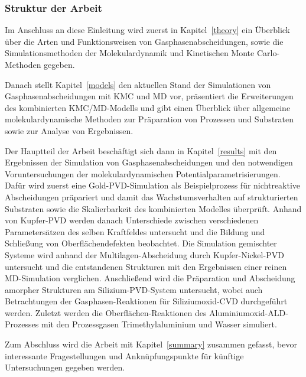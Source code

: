 \subsubsection{Struktur der Arbeit}

Im Anschluss an diese Einleitung wird zuerst in Kapitel~\ref{theory} ein Überblick über die Arten und Funktionsweisen von Gasphasenabscheidungen, sowie die Simulationsmethoden der Molekulardynamik und Kinetischen Monte Carlo-Methoden gegeben.

Danach stellt Kapitel~\ref{models} den aktuellen Stand der Simulationen von Gasphasenabscheidungen mit KMC und MD vor, präsentiert die Erweiterungen des kombinierten KMC/MD-Modells und gibt einen Überblick über allgemeine molekulardynamische Methoden zur Präparation von Prozessen und Substraten sowie zur Analyse von Ergebnissen.

Der Hauptteil der Arbeit beschäftigt sich dann in Kapitel~\ref{results} mit den Ergebnissen der Simulation von Gasphasenabscheidungen und den notwendigen Voruntersuchungen der molekulardynamischen Potentialparametrisierungen.
Dafür wird zuerst eine Gold-PVD-Simulation als Beispielprozess für nichtreaktive Abscheidungen präpariert und damit das Wachstumsverhalten auf strukturierten Substraten sowie die Skalierbarkeit des kombinierten Modelles überprüft.
Anhand von Kupfer-PVD werden danach Unterschiede zwischen verschiedenen Parametersätzen des selben Kraftfeldes untersucht und die Bildung und Schließung von Oberflächendefekten beobachtet.
Die Simulation gemischter Systeme wird anhand der Multilagen-Abscheidung durch Kupfer-Nickel-PVD untersucht und die entstandenen Strukturen mit den Ergebnissen einer reinen MD-Simulation verglichen.
Anschließend wird die Präparation und Abscheidung amorpher Strukturen am Silizium-PVD-System untersucht, wobei auch Betrachtungen der Gasphasen-Reaktionen für Siliziumoxid-CVD durchgeführt werden.
Zuletzt werden die Oberflächen-Reaktionen des Aluminiumoxid-ALD-Prozesses mit den Prozessgasen Trimethylaluminium und Wasser simuliert.

Zum Abschluss wird die Arbeit mit Kapitel~\ref{summary} zusammen gefasst, bevor interessante Fragestellungen und Anknüpfungspunkte für künftige Untersuchungen gegeben werden.
